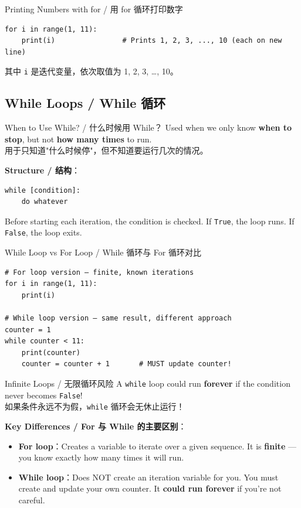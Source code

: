 \documentclass[11pt,a4paper]{article}
\begin{document}
\begin{examplebox}{Printing Numbers with for / 用 for 循环打印数字}
\begin{lstlisting}
for i in range(1, 11):
    print(i)                # Prints 1, 2, 3, ..., 10 (each on new line)
\end{lstlisting}
    其中 \texttt{i} 是迭代变量，依次取值为 1, 2, 3, …, 10。
\end{examplebox}

\subsection{While Loops / While 循环}

\begin{concept}{When to Use While? / 什么时候用 While？}
    Used when we only know \textbf{when to stop}, but not \textbf{how many times} to run. \\
    用于只知道"什么时候停"，但不知道要运行几次的情况。

    \textbf{Structure / 结构}：
    \begin{lstlisting}
while [condition]:
    do whatever
    \end{lstlisting}
    Before starting each iteration, the condition is checked. If \texttt{True}, the loop runs. If \texttt{False}, the loop exits.
\end{concept}

\begin{examplebox}{While Loop vs For Loop / While 循环与 For 循环对比}
\begin{lstlisting}
# For loop version — finite, known iterations
for i in range(1, 11):
    print(i)

# While loop version — same result, different approach
counter = 1
while counter < 11:
    print(counter)
    counter = counter + 1       # MUST update counter!
\end{lstlisting}
\end{examplebox}

\begin{warning}{Infinite Loops / 无限循环风险}
    A \texttt{while} loop could run \textbf{forever} if the condition never becomes \texttt{False}! \\
    如果条件永远不为假，\texttt{while} 循环会无休止运行！

    \textbf{Key Differences / For 与 While 的主要区别}：
    \begin{itemize}[itemsep=0.3em]
        \item \textbf{For loop}：Creates a variable to iterate over a given sequence. It is \textbf{finite} — you know exactly how many times it will run.
        \item \textbf{While loop}：Does NOT create an iteration variable for you. You must create and update your own counter. It \textbf{could run forever} if you're not careful.
    \end{itemize}
\end{warning}
\end{document}

